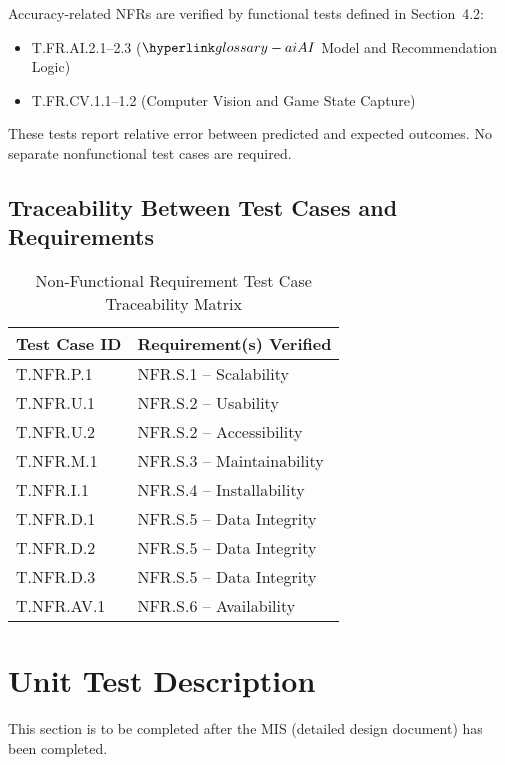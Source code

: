 \documentclass[12pt, titlepage]{article}
\begin{document}
Accuracy-related NFRs are verified by functional tests defined in Section~4.2:
\begin{itemize}
    \item T.FR.AI.2.1--2.3 ($\AI{}$ Model and Recommendation Logic)
    \item T.FR.CV.1.1--1.2 (Computer Vision and Game State Capture)
\end{itemize}
These tests report relative error between predicted and expected outcomes. No separate nonfunctional test cases are required.

\subsection{Traceability Between Test Cases and Requirements }

\begin{table}[H]
  \centering
  \caption{Non-Functional Requirement Test Case Traceability Matrix}
  \label{tab:nfr-system-test-traceability}
  \begin{tabular}{|l|l|}
    \hline
    \textbf{Test Case ID} & \textbf{Requirement(s) Verified} \\ \hline
    T.NFR.P.1   & NFR.S.1 -- Scalability \\ \hline
    T.NFR.U.1   & NFR.S.2 -- Usability \\ \hline
    T.NFR.U.2   & NFR.S.2 -- Accessibility \\ \hline
    T.NFR.M.1   & NFR.S.3 -- Maintainability \\ \hline
    T.NFR.I.1   & NFR.S.4 -- Installability \\ \hline
    T.NFR.D.1   & NFR.S.5 -- Data Integrity \\ \hline
    T.NFR.D.2   & NFR.S.5 -- Data Integrity \\ \hline
    T.NFR.D.3   & NFR.S.5 -- Data Integrity \\ \hline
    T.NFR.AV.1  & NFR.S.6 -- Availability \\ \hline
  \end{tabular}
\end{table}


\section{Unit Test Description}
This section is to be completed after the MIS (detailed design document) has been completed.
\end{document}
